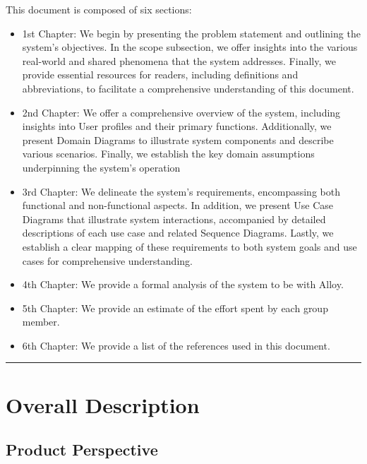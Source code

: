 \documentclass{Configuration_Files/Template}
\begin{document}
This document is composed of six sections:

\begin{itemize}
\item \textcolor{bluepoli}{1st Chapter:} We begin by presenting the problem statement and outlining the system's objectives. In the scope subsection, we offer insights into the various real-world and shared phenomena that the system addresses. Finally, we provide essential resources for readers, including definitions and abbreviations, to facilitate a comprehensive understanding of this document.
\item \textcolor{bluepoli}{2nd Chapter:} We offer a comprehensive overview of the system, including insights into User profiles and their primary functions. Additionally, we present Domain Diagrams to illustrate system components and describe various scenarios. Finally, we establish the key domain assumptions underpinning the system's operation
\item \textcolor{bluepoli}{3rd Chapter:} We delineate the system's requirements, encompassing both functional and non-functional aspects. In addition, we present Use Case Diagrams that illustrate system interactions, accompanied by detailed descriptions of each use case and related Sequence Diagrams. Lastly, we establish a clear mapping of these requirements to both system goals and use cases for comprehensive understanding.
\item \textcolor{bluepoli}{4th Chapter:} We provide a formal analysis of the system to be with Alloy.
\item \textcolor{bluepoli}{5th Chapter:} We provide an estimate of the effort spent by each group member.
\item \textcolor{bluepoli}{6th Chapter:} We provide a list of the references used in this document.
\end{itemize}

{\color{bluepoli}\rule{\linewidth}{0.1pt}}


\chapter{Overall Description}

\section{Product Perspective}
\end{document}
